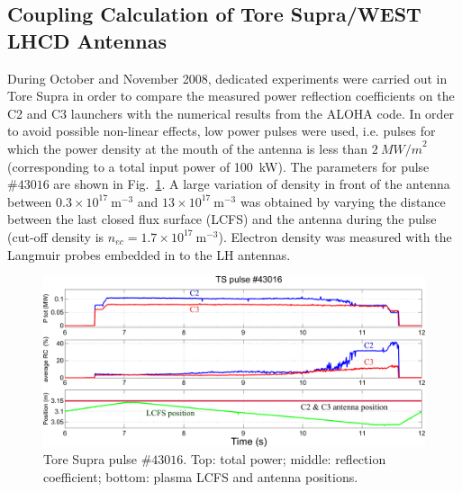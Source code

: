\subsection{Coupling Calculation of Tore Supra/WEST LHCD Antennas}

During October and November 2008, dedicated experiments were carried out in Tore Supra in order to compare the measured power reflection coefficients on the C2 and C3 launchers with the numerical results from the ALOHA code. In order to avoid possible non-linear effects\cite{petrzilka1987, ekedahl2009}, low power pulses were used, i.e. pulses for which the power density at the mouth of the antenna is less than $2~\si{MW/m}^2$ (corresponding to a total input power of 100~kW). The parameters for pulse $\#43016$ are shown in Fig.~\ref{fig:TS43016}. A large variation of density in front of the antenna between $0.3\times10^{17}~\mathrm{m}^{-3}$ and $13\times10^{17}~\mathrm{m}^{-3}$ was obtained by varying the distance between the last closed flux surface (LCFS) and the antenna during the pulse (cut-off density is $n_{ec}=1.7\times10^{17}~\mathrm{m}^{-3}$). Electron density was measured with the Langmuir probes embedded in to the LH antennas. 

\begin{figure}[h]
	\includegraphics{figures/chap2/Tore_Supra/TS43016}
	\caption{Tore Supra pulse $\#43016$. Top: total power; middle: reflection coefficient; bottom: plasma LCFS and antenna positions.}
	\label{fig:TS43016}
\end{figure}


